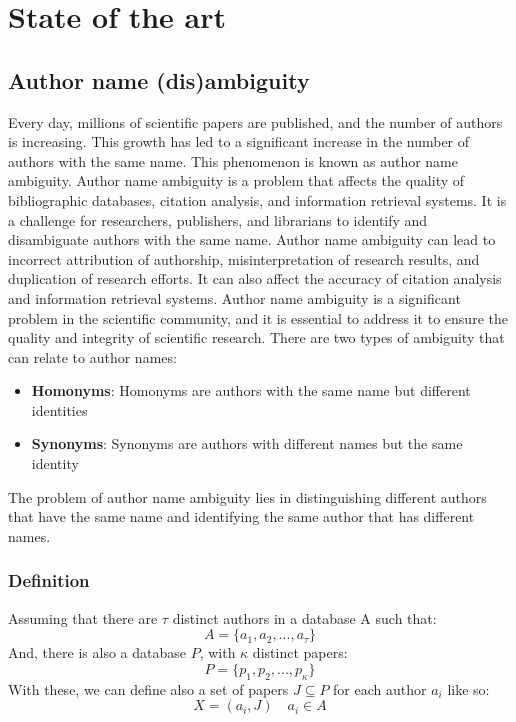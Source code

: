 \chapter{State of the art}
\label{chapters:state_of_the_art}

\section{Author name (dis)ambiguity}
\label{chapters:sections:author_name_ambiguity}
Every day, millions of scientific papers are published, and the number of authors is increasing. This growth has led to a significant increase in the number of authors with the same name. This phenomenon is known as author name ambiguity. Author name ambiguity is a problem that affects the quality of bibliographic databases, citation analysis, and information retrieval systems. It is a challenge for researchers, publishers, and librarians to identify and disambiguate authors with the same name. Author name ambiguity can lead to incorrect attribution of authorship, misinterpretation of research results, and duplication of research efforts. It can also affect the accuracy of citation analysis and information retrieval systems. Author name ambiguity is a significant problem in the scientific community, and it is essential to address it to ensure the quality and integrity of scientific research.
\break
There are two types of ambiguity that can relate to author names: 

\begin{itemize}
	\item \textbf{Homonyms}: Homonyms are authors with the same name but different identities
	\item \textbf{Synonyms}: Synonyms are authors with different names but the same identity
\end{itemize}

The problem of author name ambiguity lies in distinguishing different authors that have the same name and identifying the same author that has different names.

\subsection{Definition}
Assuming that there are $\tau$ distinct authors in a database A such that: 
\begin{displaymath}
	A = \{ a_1, a_2, ..., a_\tau \} 
\end{displaymath}
And, there is also a database $P$, with $\kappa$ distinct papers:
\begin{displaymath}
	P = \{ p_1, p_2, ..., p_\kappa \}
\end{displaymath}
With these, we can define also a set of papers $J \subseteq P$ for each author $a_i$ like so:
\begin{displaymath}
	X = (a_i, J) \quad a_i \in A
\end{displaymath}